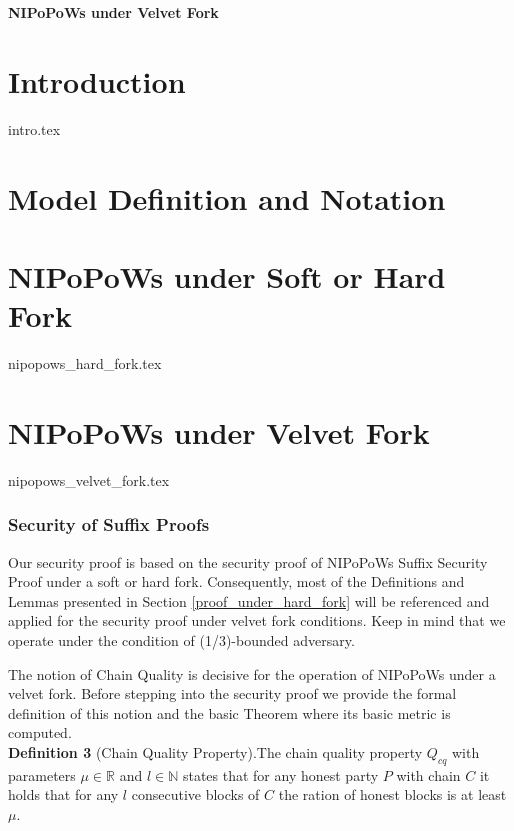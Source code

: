 \documentclass[11pt,a4paper]{article}
\begin{document}
\begin{center}
\begin{Large}
\textbf{NIPoPoWs under Velvet Fork\\}
\end{Large}

\end{center}

\section{Introduction}
{intro.tex}

\section{Model Definition and Notation}

\section{NIPoPoWs under Soft or Hard Fork}
{nipopows_hard_fork.tex}

\section{NIPoPoWs under Velvet Fork}
{nipopows_velvet_fork.tex}


\subsubsection{Security of Suffix Proofs}
Our security proof is based on the security proof of NIPoPoWs Suffix Security Proof under a soft or hard fork. Consequently, most of the Definitions and Lemmas presented in Section \ref{proof_under_hard_fork} will be referenced and applied for the security proof under velvet fork conditions. Keep in mind that we operate under the condition of (1/3)-bounded adversary.

The notion of Chain Quality is decisive for the operation of NIPoPoWs under a velvet fork. Before stepping into the security proof we provide the formal definition of this notion and the basic Theorem where its basic metric is computed.\\

\textbf{Definition 3 }(Chain Quality Property)\cite{Backbone}.The chain quality property $Q_{cq}$ with parameters $\mu \in \mathbb{R}$ and $l \in \mathbb{N}$ states that for any honest party $P$ with chain $C$ it holds that for any $l $ consecutive blocks of $C$ the ration of honest blocks is at least $\mu$.\\
\end{document}
